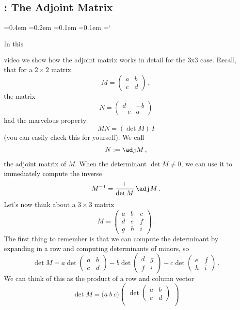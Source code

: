 
\subsection{ \propDetTitle: The Adjoint Matrix}

{\ttfamily
{}\font=0.4em
\font=0.2em
\font=0.1em
\font=0.1em
\hyphenchar\font=`\-





\hypertarget{video_properties_of_determinant_adjoint}{In this} video we show how the adjoint 
matrix works in detail for the 3x3 case. Recall, that for a $2\times 2$ matrix
\[
M=\begin{pmatrix}a&b\\c&d\end{pmatrix}\, ,
\]
the matrix
\[
N=\begin{pmatrix}d&-b\\ -c & a\end{pmatrix}
\]
had the marvelous property
\[
MN=(\det M)\, I
\]
(you can easily check this for yourself). We call \[N:=\adj M\, ,\] the 
adjoint matrix of $M$. When the determinant $\det M\neq 0$, we can use it to immediately compute the inverse
\[
M^{-1}=\frac{1}{\det M}\, \adj M\, .
\]
Let's now think about a $3\times 3$ matrix 
\[
M=\begin{pmatrix}
a &b&c\\d&e&f\\g&h&i\end{pmatrix}\, .
\]
The first thing to remember is that we can compute the determinant by expanding in a row and computing determinants of minors, so
\[
\det M = a \det\begin{pmatrix}a&b\\c&d\end{pmatrix}
-b\det\begin{pmatrix}d&g\\f&i\end{pmatrix}
+c\det\begin{pmatrix}e&f\\h&i\end{pmatrix}\, .
\]
We can think of this as the product of a row and column vector
\[
\det M = \Big( a \ b \ c \Big)
\begin{pmatrix} \det\begin{pmatrix}a&b\\c&d\end{pmatrix}\\[2mm]

\end{pmatrix}\]}
